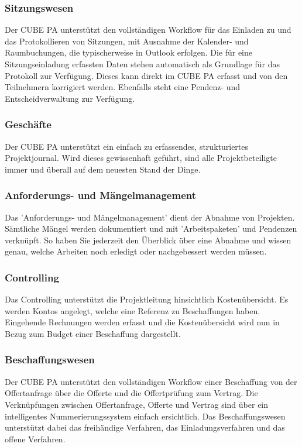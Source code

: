 \subsubsection{Sitzungswesen}

Der CUBE PA unterstützt den vollständigen Workflow für das Einladen zu und das Protokollieren von Sitzungen, mit Ausnahme der Kalender- und Raumbuchungen, die typischerweise in Outlook erfolgen. Die für eine Sitzungseinladung erfassten Daten stehen automatisch als Grundlage für das Protokoll zur Verfügung. Dieses kann direkt im CUBE PA erfasst und von den Teilnehmern korrigiert werden. Ebenfalls steht eine Pendenz- und Entscheidverwaltung zur Verfügung.

\subsubsection{Geschäfte}

Der CUBE PA unterstützt ein einfach zu erfassendes, strukturiertes Projektjournal. Wird dieses gewissenhaft geführt, sind alle Projektbeteiligte immer und überall auf dem neuesten Stand der Dinge.

\subsubsection{Anforderungs- und Mängelmanagement}

Das 'Anforderungs- und Mängelmanagement' dient der Abnahme von Projekten. Sämtliche Mängel werden dokumentiert und mit 'Arbeitspaketen' und Pendenzen verknüpft. So haben Sie jederzeit den Überblick über eine Abnahme und wissen genau, welche Arbeiten noch erledigt oder nachgebessert werden müssen.

\subsubsection{Controlling}

Das Controlling unterstützt die Projektleitung hinsichtlich Kostenübersicht. Es werden Kontos angelegt, welche eine Referenz zu Beschaffungen haben. Eingehende Rechnungen werden erfasst und die Kostenübersicht wird nun in Bezug zum Budget einer Beschaffung dargestellt. 

\subsubsection{Beschaffungswesen}

Der CUBE PA unterstützt den vollständigen Workflow einer Beschaffung von der Offertanfrage über die Offerte und die Offertprüfung zum Vertrag. Die Verknüpfungen zwischen Offertanfrage, Offerte und Vertrag sind über ein intelligentes Nummerierungssystem einfach ersichtlich. Das Beschaffungswesen unterstützt dabei das freihändige Verfahren, das Einladungsverfahren und das offene Verfahren.

